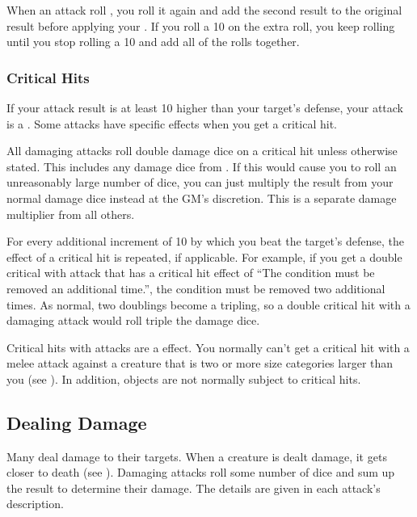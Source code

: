             When an attack roll , you roll it again and add the second result to the original result before applying your .
            If you roll a 10 on the extra roll, you keep rolling until you stop rolling a 10 and add all of the rolls together.

        \subsubsection{Critical Hits}\label{Critical Hits}
            If your attack result is at least 10 higher than your target's defense, your attack is a .
            Some attacks have specific effects when you get a critical hit.

            All damaging attacks roll double damage dice on a critical hit unless otherwise stated.
            This includes any damage dice from .
            If this would cause you to roll an unreasonably large number of dice, you can just multiply the result from your normal damage dice instead at the GM's discretion.
            This is a separate damage multiplier from all others.

            For every additional increment of 10 by which you beat the target's defense, the effect of a critical hit is repeated, if applicable.
            For example, if you get a double critical with attack that has a critical hit effect of ``The condition must be removed an additional time.'', the condition must be removed two additional times.
            As normal, two doublings become a tripling, so a double critical hit with a damaging attack would roll triple the damage dice.

            Critical hits with  attacks are a  effect.
            You normally can't get a critical hit with a melee attack against a creature that is two or more size categories larger than you (see ).
            In addition, objects are not normally subject to critical hits.

    \subsection{Dealing Damage}\label{Dealing Damage}
        Many  deal damage to their targets.
        When a creature is dealt damage, it gets closer to death (see ).
        Damaging attacks roll some number of dice and sum up the result to determine their damage.
        The details are given in each attack's description.

